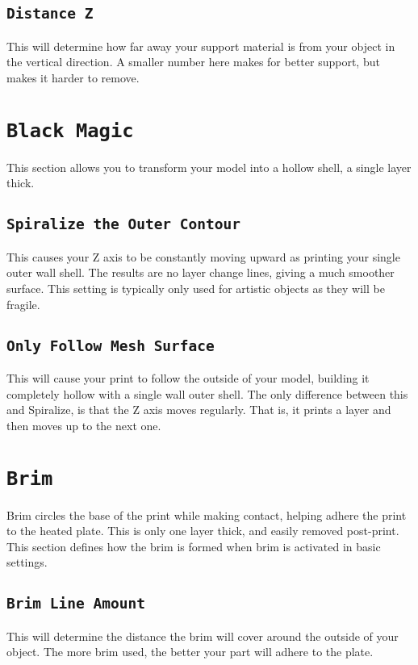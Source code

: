 \subsection{\texttt{Distance Z}}
This will determine how far away your support material is from your object in the vertical direction. A smaller number here makes for better support, but makes it harder to remove.

\section{\texttt{Black Magic}}
This section allows you to transform your model into a hollow shell, a single layer thick.

\subsection{\texttt{Spiralize the Outer Contour}}
This causes your Z axis to be constantly moving upward as printing your single outer wall shell. The results are no layer change lines, giving a much smoother surface. This setting is typically only used for artistic objects as they will be fragile.

\subsection{\texttt{Only Follow Mesh Surface}}
This will cause your print to follow the outside of your model, building it completely hollow with a single wall outer shell. The only difference between this and Spiralize, is that the Z axis moves regularly. That is, it prints a layer and then moves up to the next one.

\section{\texttt{Brim}}
Brim circles the base of the print while making contact, helping adhere the print to the heated plate. This is only one layer thick, and easily removed post-print. This section defines how the brim is formed when brim is activated in basic settings.

\subsection{\texttt{Brim Line Amount}}
This will determine the distance the brim will cover around the outside of your object. The more brim used, the better your part will adhere to the plate. 

